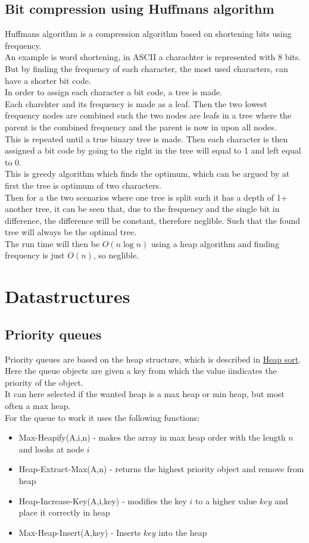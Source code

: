 \documentclass[12pt, a4paper]{article}
\begin{document}
			\subsection{Bit compression using Huffmans algorithm}
				Huffmans algorithm is a compression algorithm based on shortening bits using frequency.\\
				An example is word shortening, in ASCII a charachter is represented with 8 bits.\\
				But by finding the frequency of each character, the most used characters, can have a shorter bit code.\\
				In order to assign each character a bit code, a tree is made.\\
				Each charchter and its frequency is made as a leaf. Then the two lowest frequency nodes are combined such the two nodes are leafs in a tree where the parent is the combined frequency and the parent is now in upon all nodes.\\
				This is repeated until a true binary tree is made. Then each character is then assigned a bit code by going to the right in the tree will equal to 1 and left equal to 0.\\[4mm]
				This is greedy algorithm which finds the optimum, which can be argued by at first the tree is optimum of two characters.\\
				Then for a the two scenarios where one tree is split such it has a depth of 1+ another tree, it can be seen that, due to the frequency and the single bit in difference, the difference will be constant, therefore neglible. Such that the found tree will always be the optimal tree.\\[4mm]
				The run time will then be $O(n\log n)$ using a heap algorithm and finding frequency is just $O(n)$, so neglible.
		\section{Datastructures}
			\subsection{Priority queues}
				Priority queues are based on the heap structure, which is described in \hyperref[sec:HeapSort]{Heap sort}.\\
				Here the queue objects are given a key from which the value iindicates the priority of the object.\\
				It can here selected if the wanted heap is a max heap or min heap, but most often a max heap.\\
				For the queue to work it uses the following functions:
				\begin{itemize}
					\item Max-Heapify(A,i,n) - makes the array in max heap order with the length $n$ and looks at node $i$
					\item Heap-Extract-Max(A,n) - returns the highest priority object and remove from heap
					\item Heap-Increase-Key(A,i,key) - modifies the key $i$ to a higher value $key$ and place it correctly in heap
					\item Max-Heap-Insert(A,key) - Inserts $key$ into the heap
				\end{itemize}
\end{document}
